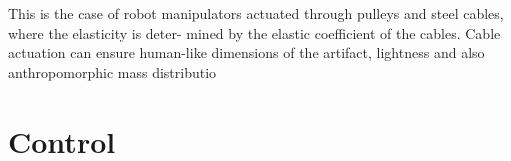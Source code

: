 This is the case of robot manipulators actuated
through pulleys and steel cables, where the elasticity is deter-
mined by the elastic coefficient of the cables. Cable actuation can
ensure human-like dimensions of the artifact, lightness and also
anthropomorphic mass distributio

\section{Control}
%
%
%
%
%
